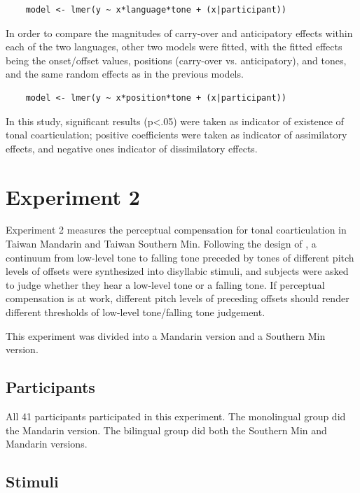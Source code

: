 \documentclass[12pt]{report}
\begin{document}
\begin{CJK}{UTF8}{bsmi}
\begin{lstlisting}
    model <- lmer(y ~ x*language*tone + (x|participant))
\end{lstlisting}

In order to compare the magnitudes of carry-over and anticipatory effects within each of the two languages, other two models were fitted, with the fitted effects being the onset/offset values, positions (carry-over vs. anticipatory), and tones, and the same random effects as in the previous models.

\begin{lstlisting}
    model <- lmer(y ~ x*position*tone + (x|participant))
\end{lstlisting}

In this study, significant results (p<.05) were taken as indicator of existence of tonal coarticulation; positive coefficients were taken as indicator of assimilatory effects, and negative ones indicator of dissimilatory effects.

\section{Experiment 2}\label{section:Experiment2}
Experiment 2 measures the perceptual compensation for tonal coarticulation in Taiwan Mandarin and Taiwan Southern Min. Following the design of \cite{Zhangetal2022}, a continuum from low-level tone to falling tone preceded by tones of different pitch levels of offsets were synthesized into disyllabic stimuli, and subjects were asked to judge whether they hear a low-level tone or a falling tone. If perceptual compensation is at work, different pitch levels of preceding offsets should render different thresholds of low-level tone/falling tone judgement.

This experiment was divided into a Mandarin version and a Southern Min version.

\subsection{Participants}
All 41 participants participated in this experiment. The monolingual group did the Mandarin version. The bilingual group did both the Southern Min and Mandarin versions.

\subsection{Stimuli}

\end{CJK}
\end{document}
